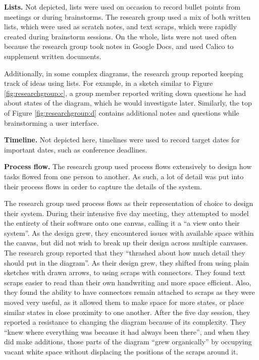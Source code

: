 \textbf{Lists.}  Not depicted, lists were used on occasion to record bullet points from meetings or during brainstorms. The research group used a mix of both written lists, which were used as scratch notes, and text scraps, which were rapidly created during brainstorm sessions. On the whole, lists were not used often because the research group took notes in Google Docs, and used Calico to supplement written documents.

Additionally, in some complex diagrams, the research group reported keeping track of ideas using lists. For example, in a sketch similar to Figure \ref{fig:researchgroup:c}, a group member reported writing down questions he had about states of the diagram, which he would investigate later. Similarly, the top of Figure \ref{fig:researchgroup:d} contains additional notes and questions while brainstorming a user interface.


\textbf{Timeline.} Not depicted here, timelines were used to record target dates for important dates, such as conference deadlines.

\textbf{Process flow.} The research group used process flows extensively to design how tasks flowed from one person to another. As such, a lot of detail was put into their process flows in order to capture the details of the system.

The research group used process flows as their representation of choice to design their system. During their intensive five day meeting, they attempted to model the entirety of their software onto one canvas, calling it a ``a view onto their system''. As the design grew, they encountered issues with available space within the canvas, but did not wish to break up their design across multiple canvases. The research group reported that they ``thrashed about how much detail they should put in the diagram''. As their design grew, they shifted from using plain sketches with drawn arrows, to using scraps with connectors. They found text scraps easier to read than their own handwriting and more space efficient. Also, they found the ability to have connectors remain attached to scraps as they were moved very useful, as it allowed them to make space for more states, or place similar states in close proximity to one another. After the five day session, they reported a resistance to changing the diagram because of its complexity. They ``knew where everything was because it had always been there'', and when they did make additions, those parts of the diagram ``grew organically'' by occupying vacant white space without displacing the positions of the scraps around it.

